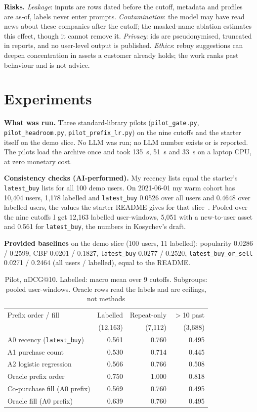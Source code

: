 \documentclass[conference]{IEEEtran}
\begin{document}
\textbf{Risks.} \emph{Leakage}: inputs are rows dated before the cutoff, metadata and profiles are as-of, labels never enter prompts. \emph{Contamination}: the model may have read news about these companies after the cutoff; the masked-name ablation estimates this effect, though it cannot remove it. \emph{Privacy}: ids are pseudonymised, truncated in reports, and no user-level output is published. \emph{Ethics}: rebuy suggestions can deepen concentration in assets a customer already holds; the work ranks past behaviour and is not advice.

\section{Experiments}\label{sec:exp}

\textbf{What was run.} Three standard-library pilots (\texttt{pilot\_gate.py}, \texttt{pilot\_headroom.py}, \texttt{pilot\_prefix\_lr.py}) on the nine cutoffs and the starter itself on the demo slice. No LLM was run; no LLM number exists or is reported. The pilots load the archive once and took 135~s, 51~s and 33~s on a laptop CPU, at zero monetary cost.

\textbf{Consistency checks (AI-performed).} My recency lists equal the starter's \texttt{latest\_buy} lists for all 100 demo users. On 2021-06-01 my warm cohort has 10{,}404 users, 1{,}178 labelled and \texttt{latest\_buy} 0.0526 over all users and 0.4648 over labelled users, the values the starter README gives for that slice~\cite{starter}. Pooled over the nine cutoffs I get 12{,}163 labelled user-windows, 5{,}051 with a new-to-user asset and 0.561 for \texttt{latest\_buy}, the numbers in Kosychev's draft.

\textbf{Provided baselines} on the demo slice (100 users, 11 labelled): popularity 0.0286 / 0.2599, CBF 0.0201 / 0.1827, \texttt{latest\_buy} 0.0277 / 0.2520, \texttt{latest\_buy\_or\_sell} 0.0271 / 0.2464 (all users / labelled), equal to the README.

\begin{table}[t]
\caption{Pilot, nDCG@10. Labelled: macro mean over 9 cutoffs. Subgroups: pooled user-windows. Oracle rows read the labels and are ceilings, not methods}
\label{tab:pilot}
\centering
\footnotesize
\begin{tabular}{@{}lrrr@{}}
\toprule
Prefix order / fill & Labelled & Repeat-only & $>$10 past\\
 & (12{,}163) & (7{,}112) & (3{,}688)\\
\midrule
A0 recency (\texttt{latest\_buy}) & 0.561 & 0.760 & 0.495\\
A1 purchase count & 0.530 & 0.714 & 0.445\\
A2 logistic regression & 0.566 & 0.766 & 0.508\\
Oracle prefix order & 0.750 & 1.000 & 0.818\\
\midrule
Co-purchase fill (A0 prefix) & 0.569 & 0.760 & 0.495\\
Oracle fill (A0 prefix) & 0.639 & 0.760 & 0.495\\
\bottomrule
\end{tabular}
\end{table}
\end{document}
